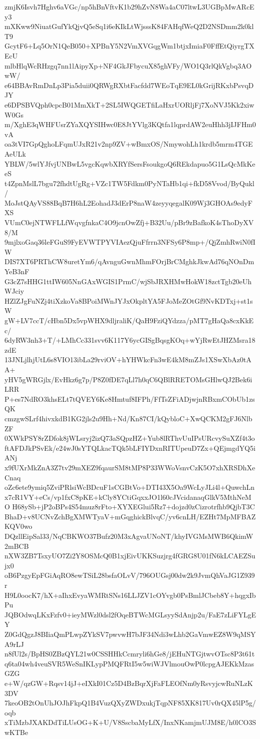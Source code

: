 zmjK6Isvh7Hghv6aVGc/np5hBnVftvK1b29hZvN8Wa4aC07ltwL3UGBpMwARcEy3
mXKww9NiuatGufYkQjvQ5eSq1i6eKIkLtWjsssK84FAHqfWeQ2D2NSDmm2k0klT9
GcytF6+Lq5OrN1QeB050+XPBnY5N2VmXVGqgWm1btjxImiaF0FffEtQiyrgTXEcU
mlbHlqWcRHzgq7nn1lAipyXp+NF4GkJFbycuX85ghVFy/WO1Q3rlQkVgbq3AOwW/
e64BBAvRmDnLp3Pia5duii0QRWgRXbtFacfdd7WEoTqE9EL0kGrijRKxbPsvqDJY
e6DPSBVQph0cpcB01MmXkT+2SL5IWQGETfiLaHxrUORljFj7XoNVJ5Kk2xiwW0Gs
m/XghE3qWHFUsrZYaXQYSIHwc0E8JtYVlg3KQtfa1lqprdAW2euHhh3jIJFHm0vA
oa3tVI7GpQghoLFqmUJxR21v2np9ZV+wBmxOS/NmywohLh1krdb5mrm4TGEAeULk
YBLW/5wlYJfvjUNBwL5vgcKqwbXRYfSersFsoukgoQ6REkdapuo5G1LsQcMkKeeS
t4ZpnMslL7bgu72fhdtUgRg+VZc1TW5Fdkm0PyNTaHb1qi+fkD58Vvod/ByQukl/
MoJstQAyVS88BqB7H6hL2EohadJ3dErP8naW4zeyyqegalK09Wj3GHOAs9edyFXS
VUmC0ejNTWFLLfWqvgfnkaC4O9jcnOwZfj+B32Uu/pBr9zBafkoK4sThoDyXV8/M
9mjlxoGaq36leFGuS9FyEVWTPYVIAezQjuFfrrn3NFSy6P8mp+/QjZmhRwiN0fIW
DIS7XT6PRThCW8uretYm6/qAvnguGwnMhmFOrjBrCMghkJkwAd76qNOnDmYeB3nF
G3cZ7sHHG1ttIW605NnGAxWGIS1PrmC/wjSbJRXHMwHokW18zctTgb20eUhWJciy
HZlZJgFuNZj4tiXzkoVa8BPoiMWnJYJxOkpltYA5FJoMeZOtGf9NvKDTxj+st1sW
gW+LV7ccT/cHbn5Dx5vpWHX9dljraliK/QaH9FziQYdzza/pMT7gHaQa8cxKkEc/
6dyRW3nh3+T/+LMhCc331svv6K117Y6ycGISgBqsgKOq+wYjRwEtJHZMsra18zdE
13JNLjlhjUtL6s8VIO13ibLa29rviOV+hYHWkcFn3wE4kM8mZJs1XSwXbAz0tAA+
yHV5gWRGjlx/EvHkz6g7p/P8Z0fDE7qLl7h0qC6QBlRRETOMsGHlwQJ2Bek6iLRR
P+es7NdRO3khsELt7tQVEY6Ke8Hmtuf8IFPh/FfTsZFiADjwjnRBxmCObUb1zsQK
cmzgwSLrf4hivxkdB1KG2jls2u9Hh+Nd/Kn87CI/kQybloC+XwQCKM2gFJ6NlbZF
0XWkPSY8rZDfok8jWLsryj2izQ73aSQpzHZ+Yub8lRThvUuIPsURcvySuXZf4t3o
ftAFDJkPSvEk/e24wJ0sYTQLkacTQk5bLFIYDxnRITUpeuD7Zx+QEjmgdYQ5iANj
x9fUXrMkZnA3Z7tv29mXEZ9fqaurSM8tMP8P33WWoVsnvCzK5O7xhXRSDhXeCnaq
oZc6ete9ymiq5ZviPRlsiWcBDcuF1sCGBtVo+DTI43X5Oa9WcLyJLi4l+QuwchLn
x7cR1VY+eCs/vp1fxC8pKE+kCly8YCtiGqxxJO1l60cJVcidanaqGlkV5MthNeMO
H68ySb+jP2oBPs4S54muz8rFto+XYXEGlui5Rz7+dojzd0zCizrotrfhb9QjbT3C
BhaD+v8UCNvZchBgXMWTyaV+mGqghickBlvqC/yv6cnLH/EZHt7MpMFBAZKQV0wo
DQzllEipSal33/NqCBKWO37Bufz20M3xAgvaUNoNT/khyIVGMsMWB6QkimW2mBCB
nXW3ZB7TsxyUO7Zi2Y8OSMcQ0B1xjEivUKKSuzjrg4fGRG8U01fN6kLCAEZSujx0
oB6PzgyEpFGiAqRO8ewTSiL28bsfaOLvV/796OUGsj00dw2k9JvmQhVaJG1Z939r
H9L0oocK7/hX+aIhxEvyaWMRtSNs16LLJZV1cOYvgb0PsBmlJCbeb8Y+hqgxIbPu
JQBOdwqLKxFzfv0+ieyMWzl0dsl2fOqeBTWcMGLsyySdAnjp2u/FaE7zLiFYLgEY
Z0GdQgzJ8BIiaQmPLwpZYkSV7pwvwH7bJF34Ndi3wLhb2GaVmwEZ8W9qMSYA9rLJ
n8fUl2s/BpHS0ZBzQYL21w0CSSHHkCcmryli6hGe8/jEHuNTGjtwvOTsc8P3t61t
q6ta04wh4veuSVR5WeSnIKLypPMQFRtI5w5wiWJVlmouOwP0lcpgAJEKkMzasGZG
e+W/qzGW+Rqsv14jJ+eIXkI01Cz5D4BzBqrXjFaFLEOfNm0yRsvyjcwRuNLzK3DV
7keoOB2tOnUhJOJhFkpQ1B4VuzQXyZWDxukjTqpNF85XK817Uv0rQX45lP5g/oqb
xTiMzbJXAKDdTiLUsOG+K+U/V8SscbaMyLfX/InxNKamjmUJM8E/h0lCO3SwKTBe
